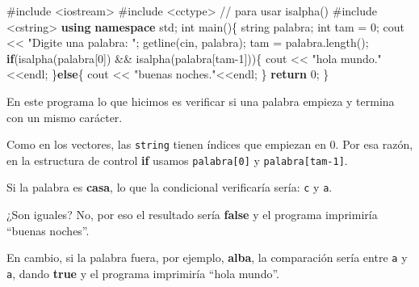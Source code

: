 \documentclass[
  11pt,
  a4paper,
  DIV=11,
  numbers=noendperiod]{scrreprt}
\newenvironment{Shaded}{\begin{snugshade}}{\end{snugshade}}
\newcommand{\CommentTok}[1]{\textcolor[rgb]{0.37,0.37,0.37}{#1}}
\newcommand{\ControlFlowTok}[1]{\textcolor[rgb]{0.00,0.23,0.31}{\textbf{#1}}}
\newcommand{\DataTypeTok}[1]{\textcolor[rgb]{0.68,0.00,0.00}{#1}}
\newcommand{\DecValTok}[1]{\textcolor[rgb]{0.68,0.00,0.00}{#1}}
\newcommand{\ImportTok}[1]{\textcolor[rgb]{0.00,0.46,0.62}{#1}}
\newcommand{\KeywordTok}[1]{\textcolor[rgb]{0.00,0.23,0.31}{\textbf{#1}}}
\newcommand{\NormalTok}[1]{\textcolor[rgb]{0.00,0.23,0.31}{#1}}
\newcommand{\OperatorTok}[1]{\textcolor[rgb]{0.37,0.37,0.37}{#1}}
\newcommand{\PreprocessorTok}[1]{\textcolor[rgb]{0.68,0.00,0.00}{#1}}
\newcommand{\StringTok}[1]{\textcolor[rgb]{0.13,0.47,0.30}{#1}}
\begin{document}
\begin{Shaded}
\begin{Highlighting}[]
\PreprocessorTok{\#include }\ImportTok{\textless{}iostream\textgreater{}}
\PreprocessorTok{\#include }\ImportTok{\textless{}cctype\textgreater{}}\PreprocessorTok{ }\CommentTok{// para usar isalpha()}
\PreprocessorTok{\#include }\ImportTok{\textless{}cstring\textgreater{}}
\KeywordTok{using} \KeywordTok{namespace}\NormalTok{ std}\OperatorTok{;}
\DataTypeTok{int}\NormalTok{ main}\OperatorTok{()\{}
\NormalTok{    string palabra}\OperatorTok{;}
    \DataTypeTok{int}\NormalTok{ tam }\OperatorTok{=} \DecValTok{0}\OperatorTok{;}
\NormalTok{    cout }\OperatorTok{\textless{}\textless{}} \StringTok{"Digite una palabra: "}\OperatorTok{;}
\NormalTok{    getline}\OperatorTok{(}\NormalTok{cin}\OperatorTok{,}\NormalTok{ palabra}\OperatorTok{);}
\NormalTok{    tam }\OperatorTok{=}\NormalTok{ palabra}\OperatorTok{.}\NormalTok{length}\OperatorTok{();}
    \ControlFlowTok{if}\OperatorTok{(}\NormalTok{isalpha}\OperatorTok{(}\NormalTok{palabra}\OperatorTok{[}\DecValTok{0}\OperatorTok{])} \OperatorTok{\&\&}\NormalTok{ isalpha}\OperatorTok{(}\NormalTok{palabra}\OperatorTok{[}\NormalTok{tam}\OperatorTok{{-}}\DecValTok{1}\OperatorTok{]))\{}
\NormalTok{        cout }\OperatorTok{\textless{}\textless{}} \StringTok{"hola mundo."}\OperatorTok{\textless{}\textless{}}\NormalTok{endl}\OperatorTok{;}
    \OperatorTok{\}}\ControlFlowTok{else}\OperatorTok{\{}
\NormalTok{        cout }\OperatorTok{\textless{}\textless{}} \StringTok{"buenas noches."}\OperatorTok{\textless{}\textless{}}\NormalTok{endl}\OperatorTok{;}
    \OperatorTok{\}}
    \ControlFlowTok{return} \DecValTok{0}\OperatorTok{;}
\OperatorTok{\}}
\end{Highlighting}
\end{Shaded}

En este programa lo que hicimos es verificar si una palabra empieza y
termina con un mismo carácter.

Como en los vectores, las \texttt{string} tienen índices que empiezan en
0. Por esa razón, en la estructura de control \textbf{if} usamos
\texttt{palabra{[}0{]}} y \texttt{palabra{[}tam-1{]}}.

Si la palabra es \textbf{casa}, lo que la condicional verificaría sería:
\texttt{c} y \texttt{a}.

¿Son iguales? No, por eso el resultado sería \textbf{false} y el
programa imprimiría ``buenas noches''.

En cambio, si la palabra fuera, por ejemplo, \textbf{alba}, la
comparación sería entre \texttt{a} y \texttt{a}, dando \textbf{true} y
el programa imprimiría ``hola mundo''.
\end{document}
